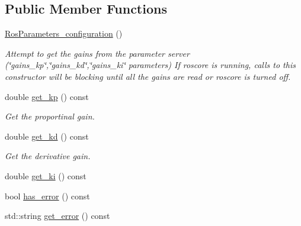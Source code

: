\subsection*{Public Member Functions}
\begin{DoxyCompactItemize}
\item 
\hyperlink{classci__example__cpp_1_1RosParameters__configuration_aca978c1389d0f672f9cf2e9a68b131c3}{Ros\+Parameters\+\_\+configuration} ()
\begin{DoxyCompactList}\small\item\em Attempt to get the gains from the parameter server (\char`\"{}gains\+\_\+kp\char`\"{},\char`\"{}gains\+\_\+kd\char`\"{},\char`\"{}gains\+\_\+ki\char`\"{} parameters) If roscore is running, calls to this constructor will be blocking until all the gains are read or roscore is turned off. \end{DoxyCompactList}\item 
\mbox{\label{classci__example__cpp_1_1RosParameters__configuration_a49ccc6c0db59063f1475f08dce23ee5d}} 
double \hyperlink{classci__example__cpp_1_1RosParameters__configuration_a49ccc6c0db59063f1475f08dce23ee5d}{get\+\_\+kp} () const
\begin{DoxyCompactList}\small\item\em Get the proportinal gain. \end{DoxyCompactList}\item 
\mbox{\label{classci__example__cpp_1_1RosParameters__configuration_a90eb8bc0d9b4b663cde21fe07d44847e}} 
double \hyperlink{classci__example__cpp_1_1RosParameters__configuration_a90eb8bc0d9b4b663cde21fe07d44847e}{get\+\_\+kd} () const
\begin{DoxyCompactList}\small\item\em Get the derivative gain. \end{DoxyCompactList}\item 
double \hyperlink{classci__example__cpp_1_1RosParameters__configuration_a01be945f19c9fc4734f28460a335e731}{get\+\_\+ki} () const
\item 
bool \hyperlink{classci__example__cpp_1_1RosParameters__configuration_afcf30b3c93eb3d215d8dfb852eaaae52}{has\+\_\+error} () const
\item 
std\+::string \hyperlink{classci__example__cpp_1_1RosParameters__configuration_aa6c44530007d18df221b22b84abcedea}{get\+\_\+error} () const
\end{DoxyCompactItemize}
